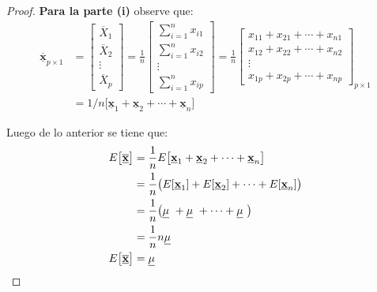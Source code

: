 \documentclass[
]{book}
\theoremstyle{definition}
\theoremstyle{definition}
\theoremstyle{definition}
\theoremstyle{definition}
\theoremstyle{remark}
\begin{document}
\begin{proof}
\textbf{Para la parte (i)} observe que:
\begin{align*}
\underline{\overline{\mathbf{x}}}_{p\times 1}&=\begin{bmatrix}
\overline{X}_1 \\ \overline{X}_2 \\ \vdots \\ \overline{X}_p
\end{bmatrix} =\frac{1}{n}\begin{bmatrix}
\sum_{i=1}^n x_{i1}\\
\sum_{i=1}^n x_{i2}\\
\vdots  \\
\sum_{i=1}^n x_{ip}
\end{bmatrix}= \frac{1}{n}\begin{bmatrix}
x_{11} + x_{21}+ \cdots + x_{n1}\\
x_{12} + x_{22}+ \cdots + x_{n2}\\
\vdots \\
x_{1p} + x_{2p}+ \cdots + x_{np}
\end{bmatrix}_{p\times 1}\\
&=1/n\bigl[\underline{\mathbf{x}}_1+\underline{\mathbf{x}}_2+\cdots+
\underline{\mathbf{x}}_n\bigr]
\end{align*}

Luego de lo anterior se tiene que:
\begin{align*}
E\bigl[\underline{\overline{\mathbf{x}}}\bigr]&=\frac{1}{n}E\bigl[\underline{\mathbf{x}}_1+\underline{\mathbf{x}}_2+\cdots+
                                                     \underline{\mathbf{x}}_n\bigr]\\
&=\frac{1}{n}\bigl(E[\underline{\mathbf{x}}_1]+E[\underline{\mathbf{x}}_2]+
                \cdots+E[\underline{\mathbf{x}}_n]\bigr)\\
&=\frac{1}{n}\bigl(
{\large \underline{\mathbf{\mu}}}\ +
{\large \underline{\mathbf{\mu}}}\ +\cdots+
{\large \underline{\mathbf{\mu}}}\ \bigr)\\
&=\frac{1}{n}n
{\large \underline{\mathbf{\mu}}}\ \\
E\bigl[\underline{\overline{\mathbf{x}}}\bigr]&=
{\large \underline{\mathbf{\mu}}}\ 
\end{align*}


\end{proof}
\end{document}
